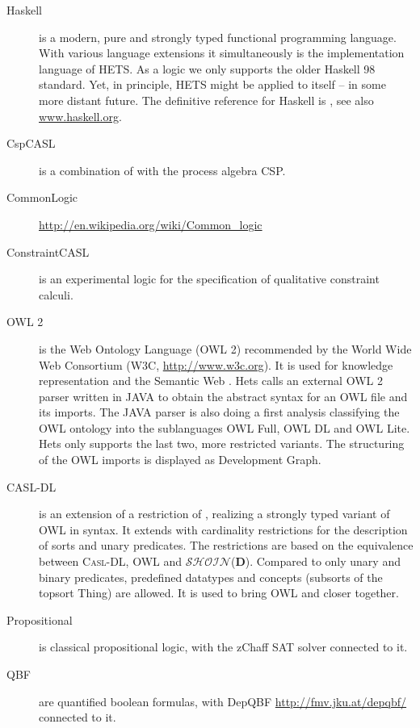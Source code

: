 \documentclass{article}
\newcommand{\normalTEXTSC}[2]{{#1\scriptsize#2}}
\newcommand     {\Hets}{\normalTEXTSC{H}{ETS}\xspace}
\newcommand{\CASLDL}{\textmd{\textsc{Casl-DL}}\xspace}
\newcommand{\SHOIN}{$\mathcal{SHOIN}$(\textbf{D})\xspace}
\newcommand{\Csp}{\normalTEXTSC{C}{SP}\xspace}
\begin{document}
\begin{description}
\item[Haskell] is a modern, pure and strongly typed functional programming
  language. With various language extensions it simultaneously is the
  implementation language of \Hets. As a logic we only supports the older
  Haskell 98 standard.  Yet, in principle, \Hets might be applied to itself --
  in some more distant future.  The definitive reference for Haskell is
  \cite{PeytonJones03}, see also \url{www.haskell.org}.

\item[CspCASL] \cite{Roggenbach06} is a combination of \CASL
  with the process algebra \Csp.

\item[CommonLogic] \url{http://en.wikipedia.org/wiki/Common_logic}

\item[ConstraintCASL] is an experimental logic for the specification
of qualitative constraint calculi.

\item[OWL 2] is the Web Ontology Language (OWL 2) recommended by the
  World Wide Web Consortium (W3C, \url{http://www.w3c.org}). It is
  used for knowledge representation and the Semantic Web
  \cite{berners:2001:SWeb}.
Hets calls an external OWL 2 parser
  written in JAVA to obtain the abstract syntax for an OWL file and its
  imports. The JAVA parser is also doing a first analysis classifying
  the OWL ontology into the sublanguages OWL Full, OWL DL and OWL
  Lite.
 Hets only supports the last two, more restricted variants.
The
  structuring of the OWL imports is displayed as Development Graph.

\item[CASL-DL] \cite{OWL-CASL-WADT2004}
is an extension of a restriction of \CASL, realizing
a strongly typed variant of OWL in \CASL syntax.
It extends
  \CASL with cardinality restrictions for the description of sorts and
  unary predicates. The restrictions are based on the equivalence
  between \CASLDL, OWL and \SHOIN. Compared to \CASL only unary
  and binary predicates, predefined datatypes and concepts (subsorts
  of the topsort Thing) are allowed. It is used to bring OWL and
  \CASL closer together.

\item[Propositional] is classical propositional logic, with
the zChaff SAT solver \cite{Herbstritt03} connected to it.

\item[QBF] are quantified boolean formulas, with
DepQBF \url{http://fmv.jku.at/depqbf/} connected to it.


\end{description}
\end{document}
